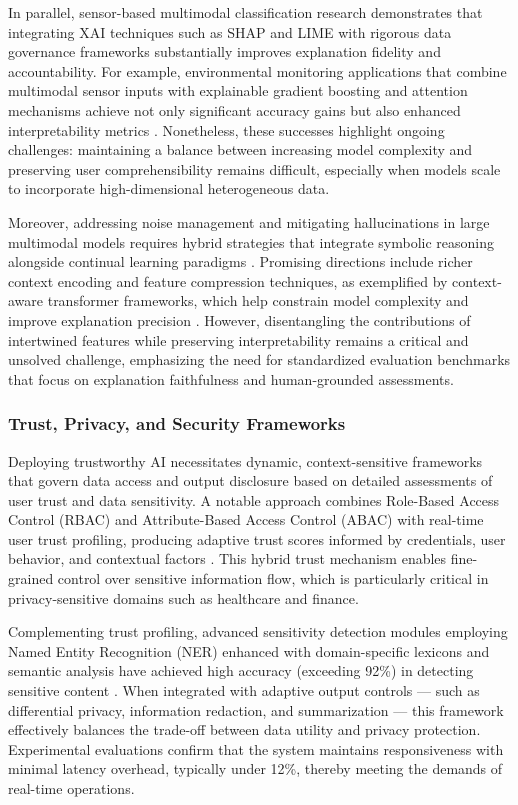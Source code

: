 In parallel, sensor-based multimodal classification research demonstrates that integrating XAI techniques such as SHAP and LIME with rigorous data governance frameworks substantially improves explanation fidelity and accountability. For example, environmental monitoring applications that combine multimodal sensor inputs with explainable gradient boosting and attention mechanisms achieve not only significant accuracy gains but also enhanced interpretability metrics \cite{ref25}. Nonetheless, these successes highlight ongoing challenges: maintaining a balance between increasing model complexity and preserving user comprehensibility remains difficult, especially when models scale to incorporate high-dimensional heterogeneous data.

Moreover, addressing noise management and mitigating hallucinations in large multimodal models requires hybrid strategies that integrate symbolic reasoning alongside continual learning paradigms \cite{ref13,ref24,ref25}. Promising directions include richer context encoding and feature compression techniques, as exemplified by context-aware transformer frameworks, which help constrain model complexity and improve explanation precision \cite{ref17}. However, disentangling the contributions of intertwined features while preserving interpretability remains a critical and unsolved challenge, emphasizing the need for standardized evaluation benchmarks that focus on explanation faithfulness and human-grounded assessments.

\subsubsection{Trust, Privacy, and Security Frameworks}

Deploying trustworthy AI necessitates dynamic, context-sensitive frameworks that govern data access and output disclosure based on detailed assessments of user trust and data sensitivity. A notable approach combines Role-Based Access Control (RBAC) and Attribute-Based Access Control (ABAC) with real-time user trust profiling, producing adaptive trust scores informed by credentials, user behavior, and contextual factors \cite{ref11}. This hybrid trust mechanism enables fine-grained control over sensitive information flow, which is particularly critical in privacy-sensitive domains such as healthcare and finance.

Complementing trust profiling, advanced sensitivity detection modules employing Named Entity Recognition (NER) enhanced with domain-specific lexicons and semantic analysis have achieved high accuracy (exceeding 92\%) in detecting sensitive content \cite{ref11}. When integrated with adaptive output controls — such as differential privacy, information redaction, and summarization — this framework effectively balances the trade-off between data utility and privacy protection. Experimental evaluations confirm that the system maintains responsiveness with minimal latency overhead, typically under 12\%, thereby meeting the demands of real-time operations.

